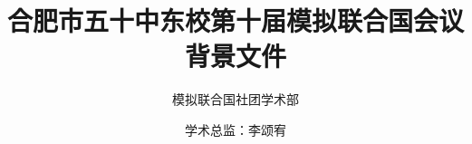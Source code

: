 \documentclass{article}
\title{合肥市五十中东校第十届模拟联合国会议\\\huge 背景文件}
\author{模拟联合国社团学术部 \\ \and 学术总监：李颂宥}
\begin{document}
    \centering
    \maketitle
    \clearpage
    \tableofcontents
\end{document}
